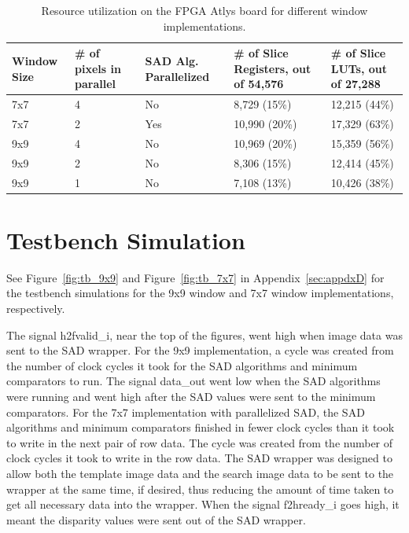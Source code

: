 \begin{table}
\begin{center}
	\begin{tabular}{| p{1.9cm} | p{2.2cm} | p{2.5cm} | p{2.9cm} | p{2.7cm} |}
		\hline
		\rowstyle{\bfseries} Window Size & 
		\rowstyle{\bfseries} \# of pixels in parallel & 
		\rowstyle{\bfseries} SAD Alg. Parallelized & 
		\rowstyle{\bfseries} \# of Slice Registers, out of 54,576 &
		\rowstyle{\bfseries} \# of Slice LUTs, out of 27,288 %
		\tabularnewline
		\hline
		7x7 & 4 & No & 8,729 (15\%) & 12,215 (44\%)
		\tabularnewline
		\hline 
		\rowstyle{\bfseries} 7x7 & 
		\rowstyle{\bfseries} 2 & 
		\rowstyle{\bfseries} Yes & 
		\rowstyle{\bfseries} 10,990 (20\%) & 
		\rowstyle{\bfseries} 17,329 (63\%)  
		\tabularnewline
		\hline 
		\rowstyle{\bfseries} 9x9 & 
		\rowstyle{\bfseries} 4 & 
		\rowstyle{\bfseries} No & 
		\rowstyle{\bfseries} 10,969 (20\%) & 
		\rowstyle{\bfseries} 15,359 (56\%) 
		\tabularnewline
		\hline
		9x9 & 2 & No & 8,306 (15\%) & 12,414 (45\%)
		\tabularnewline
		\hline 
		9x9 & 1 & No & 7,108 (13\%) & 10,426 (38\%)
		\tabularnewline
		\hline 
	\end{tabular}
	\captionfonts
	\caption{Resource utilization on the FPGA Atlys board for different window implementations.}
	\label{table:utilize}
\end{center}
\end{table}

\section{Testbench Simulation}
\label{sec:testbench}

See Figure~\ref{fig:tb_9x9} and Figure~\ref{fig:tb_7x7} in Appendix~\ref{sec:appdxD} for the testbench simulations for the 9x9 window and 7x7 window implementations, respectively.

The signal h2fvalid\_i, near the top of the figures, went high when image data was sent to the SAD wrapper. For the 9x9 implementation, a cycle was created from the number of clock cycles it took for the SAD algorithms and minimum comparators to run. The signal data\_out went low when the SAD algorithms were running and went high after the SAD values were sent to the minimum comparators. For the 7x7 implementation with parallelized SAD, the SAD algorithms and minimum comparators finished in fewer clock cycles than it took to write in the next pair of row data. The cycle was created from the number of clock cycles it took to write in the row data. The SAD wrapper was designed to allow both the template image data and the search image data to be sent to the wrapper at the same time, if desired, thus reducing the amount of time taken to get all necessary data into the wrapper. When the signal f2hready\_i goes high, it meant the disparity values were sent out of the SAD wrapper.

